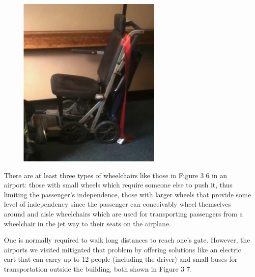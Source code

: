 \documentclass[a4paper, 12pt,conference]{new_cit_thesis}
\begin{document}
\begin{list}{-}{}
\begin{figure}[h]
     \includegraphics[width=7cm]{images/image036}
  \label{fig:36}
\end{figure}

  \item There are at least three types of wheelchairs like those in Figure 3 6 in an airport: those with small wheels which require someone else to push it, thus limiting the passenger’s independence, those with larger wheels that provide some level of independency since the passenger can conceivably wheel themselves around and aisle wheelchairs which are used for transporting passengers from a wheelchair in the jet way to their seats on the airplane.
  \item One is normally required to walk long distances to reach one’s gate. However, the airports we visited mitigated that problem by offering solutions like an electric cart that can carry up to 12 people (including the driver) and small buses for transportation outside the building, both shown in Figure 3 7.


\end{list}
\end{document}
